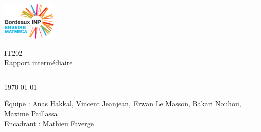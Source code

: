 \documentclass[a4paper,11pts]{article}
\begin{document}
\begin{center}

\includegraphics[width=100px]{img/enseirb-matmeca}

\Huge{IT202}\\
\Huge{Rapport intermédiaire}
\noindent\rule{10cm}{0.4pt}

\normalsize{\today}

\vspace{1cm}

\Large{\'{E}quipe : Anas Hakkal, Vincent Jeanjean, Erwan Le Masson, Bakari Nouhou, Maxime Paillassa}\\
\Large{Encadrant : Mathieu Faverge}

\end{center}

\clearpage








\end{document}
